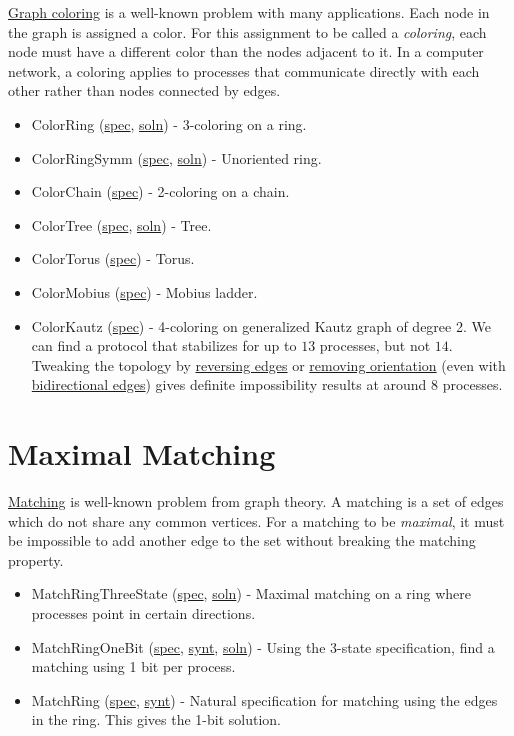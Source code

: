 \href{http://en.wikipedia.org/wiki/Graph_coloring}{Graph coloring} is a well-known problem with many applications.
Each node in the graph is assigned a color.
For this assignment to be called a \textit{coloring}, each node must have a different color than the nodes adjacent to it.
In a computer network, a coloring applies to processes that communicate directly with each other rather than nodes connected by edges.
\begin{itemize}
\item ColorRing (\href{examplespec/ColorRing.prot}{spec}, \href{examplesoln/ColorRing.prot}{soln})
- 3-coloring on a ring.
\item ColorRingSymm (\href{examplespec/ColorRingSymm.prot}{spec}, \href{examplesoln/ColorRingSymm.prot}{soln})
- Unoriented ring.
\item ColorChain (\href{examplespec/ColorChain.prot}{spec})
- 2-coloring on a chain.
\item ColorTree (\href{examplespec/ColorTree.prot}{spec}, \href{examplesoln/ColorTree.prot}{soln})
- Tree.
\item ColorTorus (\href{examplespec/ColorTorus.prot}{spec})
- Torus.
\item ColorMobius (\href{examplespec/ColorMobius.prot}{spec})
- Mobius ladder.
\item ColorKautz (\href{examplespec/ColorKautz.prot}{spec})
- 4-coloring on generalized Kautz graph of degree 2.
We can find a protocol that stabilizes for up to $13$ processes, but not $14$.
Tweaking the topology by
\href{examplespec/ColorKautzReverse.prot}{reversing edges}
or
\href{examplespec/ColorKautzSymm.prot}{removing orientation}
(even with \href{examplespec/ColorKautzBi.prot}{bidirectional edges})
gives definite impossibility results at around $8$ processes.
\end{itemize}

\section{Maximal Matching}

\href{http://en.wikipedia.org/wiki/Matching_(graph_theory)}{Matching} is well-known problem from graph theory.
A matching is a set of edges which do not share any common vertices.
For a matching to be \textit{maximal}, it must be impossible to add another edge to the set without breaking the matching property.
\begin{itemize}
\item MatchRingThreeState (\href{examplespec/MatchRingThreeState.prot}{spec}, \href{examplesoln/MatchRingThreeState.prot}{soln})
- Maximal matching on a ring where processes point in certain directions.
\item MatchRingOneBit (\href{examplespec/MatchRingOneBit.prot}{spec}, \href{examplesynt/MatchRingOneBit.prot}{synt}, \href{examplesoln/MatchRingOneBit.prot}{soln})
- Using the 3-state specification, find a matching using 1 bit per process.
\item MatchRing (\href{examplespec/MatchRing.prot}{spec}, \href{examplesynt/MatchRing.prot}{synt})
- Natural specification for matching using the edges in the ring.
This gives the 1-bit solution.
\end{itemize}

